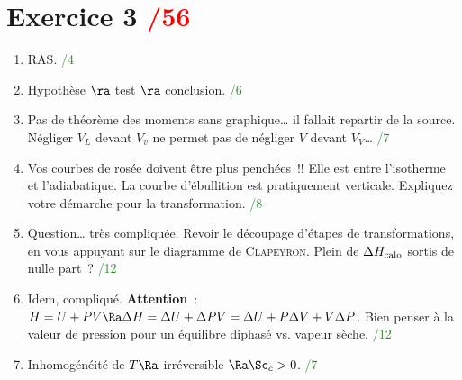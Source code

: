 \documentclass[a4paper, 11pt, final, garamond]{book}
\begin{document}
\section{Exercice 3 \hfill \textcolor{red}{/56}}
\begin{enumerate}
	\item RAS.
	      \hfill \textcolor{ForestGreen}{/4}
	\item Hypothèse $\ra$ test $\ra$ conclusion.
	      \hfill \textcolor{ForestGreen}{/6}
	\item Pas de théorème des moments sans graphique… il fallait repartir de la
	      source. Négliger $V_L$ devant $V_v$ ne permet pas de négliger $V$ devant
	      $V_V$…
	      \hfill \textcolor{ForestGreen}{/7}
	\item {\Large Vos courbes de rosée doivent être plus penchées~!!} Elle est
	      entre l'isotherme et l'adiabatique. La courbe d'ébullition est pratiquement
	      verticale. Expliquez votre démarche pour la transformation.
	      \hfill \textcolor{ForestGreen}{/8}
	\item Question… très compliquée. Revoir le découpage d'étapes de
	      transformations, en vous appuyant sur le diagramme de \textsc{Clapeyron}.
	      Plein de $\Delta{H}_{\rm calo}$ sortis de nulle part~?
	      \hfill \textcolor{ForestGreen}{/12}
	\item Idem, compliqué. \textbf{Attention}~: $H = U + PV \Ra \Delta{H} =
		      \Delta{U} + \Delta{PV} = \Delta{U} + P \Delta{V} + V \Delta{P}$. Bien penser
	      à la valeur de pression pour un équilibre diphasé vs. vapeur sèche.
	      \hfill \textcolor{ForestGreen}{/12}
	\item Inhomogénéité de $T \Ra$ irréversible $\Ra \Sc_c > 0$.
	      \hfill \textcolor{ForestGreen}{/7}
\end{enumerate}
\end{document}
